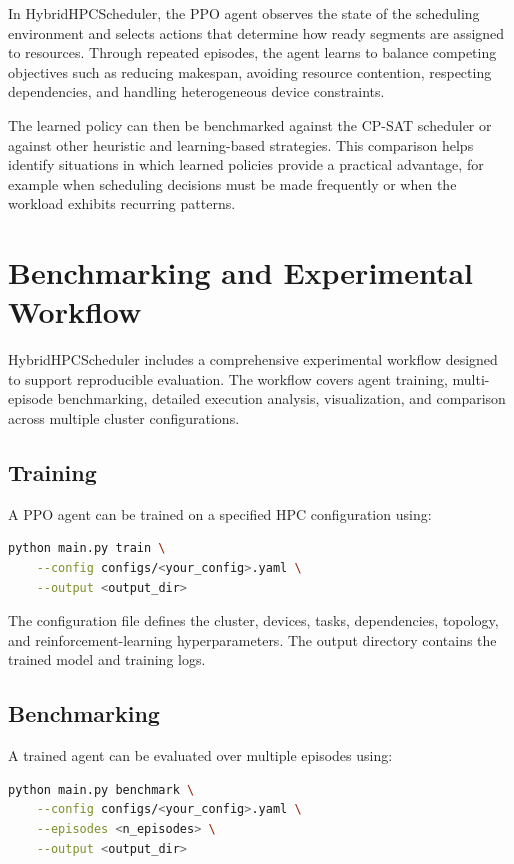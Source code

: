 \documentclass[conference]{IEEEtran}
\begin{document}
In HybridHPCScheduler, the PPO agent observes the state of the scheduling
environment and selects actions that determine how ready segments are assigned
to resources. Through repeated episodes, the agent learns to balance competing
objectives such as reducing makespan, avoiding resource contention, respecting
dependencies, and handling heterogeneous device constraints.

The learned policy can then be benchmarked against the CP-SAT scheduler or
against other heuristic and learning-based strategies. This comparison helps
identify situations in which learned policies provide a practical advantage,
for example when scheduling decisions must be made frequently or when the
workload exhibits recurring patterns.

\section{Benchmarking and Experimental Workflow}
HybridHPCScheduler includes a comprehensive experimental workflow designed to
support reproducible evaluation. The workflow covers agent training,
multi-episode benchmarking, detailed execution analysis, visualization, and
comparison across multiple cluster configurations.

\subsection{Training}
A PPO agent can be trained on a specified HPC configuration using:
\begin{lstlisting}[language=bash]
python main.py train \
    --config configs/<your_config>.yaml \
    --output <output_dir>
\end{lstlisting}

The configuration file defines the cluster, devices, tasks, dependencies,
topology, and reinforcement-learning hyperparameters. The output directory
contains the trained model and training logs.

\subsection{Benchmarking}
A trained agent can be evaluated over multiple episodes using:
\begin{lstlisting}[language=bash]
python main.py benchmark \
    --config configs/<your_config>.yaml \
    --episodes <n_episodes> \
    --output <output_dir>
\end{lstlisting}
\end{document}
